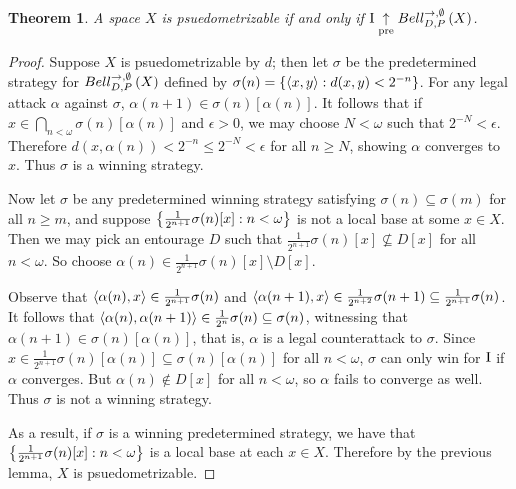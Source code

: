 \documentclass{amsart}
\newtheorem{theorem}{Theorem}[section]
\theoremstyle{definition}
\begin{document}
\begin{theorem}
A space \(X\) is psuedometrizable
if and only if 
\(\mathrm{I}\underset{\text{pre}}{\uparrow}Bell_{D,P}^{\to,\emptyset}\left({X}\right)\). 
\end{theorem}
\begin{proof}
Suppose \(X\) is psuedometrizable by \(d\);
then let \(\sigma\) be the predetermined strategy for \(Bell_{D,P}^{\to,\emptyset}\left({X}\right)\) defined by
\(\sigma(n)=\left\{\left\langle x,y\right\rangle:d(x,y)<2^{-n}\right\}\). 
For any legal attack \(\alpha\) against \(\sigma\), \(\alpha(n+1)\in\sigma(n)[\alpha(n)]\).
It follows that if \(x\in\bigcap_{n<\omega}\sigma(n)[\alpha(n)]\) and \(\epsilon>0\),
we may choose \(N<\omega\) such that \(2^{-N}<\epsilon\). Therefore 
\(d(x,\alpha(n))<2^{-n}\leq 2^{-N}<\epsilon\) for all \(n\geq N\), showing \(\alpha\) converges
to \(x\). Thus \(\sigma\) is a winning strategy.

Now let \(\sigma\) be any predetermined winning strategy satisfying \(\sigma(n)\subseteq\sigma(m)\)
for all \(n\geq m\), and suppose \(\left\{\frac{1}{2^{n+1}}\sigma(n)[x]:n<\omega\right\}\) is not a
local base at some \(x\in X\). Then we may pick an entourage \(D\) such that
\(\frac{1}{2^{n+1}}\sigma(n)[x]\not\subseteq D[x]\) for all \(n<\omega\). So choose
\(\alpha(n)\in\frac{1}{2^{n+1}}\sigma(n)[x]\setminus D[x]\).

Observe that \(\left\langle \alpha(n),x\right\rangle\in\frac{1}{2^{n+1}}\sigma(n)\) and
\(\left\langle \alpha(n+1),x\right\rangle\in\frac{1}{2^{n+2}}\sigma(n+1)\subseteq\frac{1}{2^{n+1}}\sigma(n)\).
It follows that \(\left\langle \alpha(n),\alpha(n+1)\right\rangle\in\frac{1}{2^n}\sigma(n)\subseteq\sigma(n)\),
witnessing that \(\alpha(n+1)\in\sigma(n)[\alpha(n)]\), that is, \(\alpha\) is a legal counterattack
to \(\sigma\). Since \(x\in\frac{1}{2^{n+1}}\sigma(n)[\alpha(n)]\subseteq\sigma(n)[\alpha(n)]\)
for all \(n<\omega\), \(\sigma\) can only win for \(\mathrm{I}\) if \(\alpha\) converges.
But \(\alpha(n)\not\in D[x]\) for all \(n<\omega\), so \(\alpha\) fails to converge as well.
Thus \(\sigma\) is not a winning strategy.

As a result, if \(\sigma\) is a winning predetermined strategy,
we have that \(\left\{\frac{1}{2^{n+1}}\sigma(n)[x]:n<\omega\right\}\) is a
local base at each \(x\in X\). Therefore by the previous lemma,
\(X\) is psuedometrizable.
\end{proof}



\end{document}
